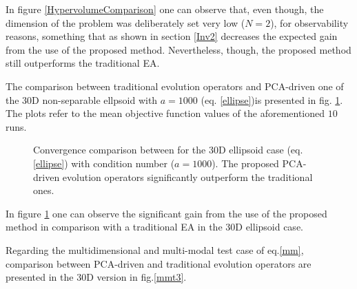 In figure \ref{HypervolumeComparison} one can observe that, even though, the dimension of the problem was deliberately set very low ($N=2$), for observability reasons, something that as shown in section \ref{Inv2} decreases the expected gain from the use of the proposed method. Nevertheless, though, the proposed method still outperforms the traditional EA.  

The comparison between traditional evolution operators and PCA-driven one of the 30D non-separable ellpsoid with $a=1000$ (eq. \ref{ellipse})is presented in fig. \ref{Ellt3}. The plots refer to the mean objective function values of the aforementioned $10$ runs. 

\begin{figure}[h!]
\begin{minipage}[b]{1\linewidth}
 \centering
\end{minipage}
\caption{Convergence comparison between for the 30D ellipsoid case (eq. \ref{ellipse}) with condition number ($a = 1000$). The proposed PCA-driven evolution operators significantly outperform the traditional ones.} 
\label{Ellt3}
\end{figure}

In figure \ref{Ellt3} one can observe the significant gain from the use of the proposed method in comparison with a traditional EA in the 30D ellipsoid case.

Regarding the multidimensional and multi-modal test case of eq.\ref{mm}, comparison between PCA-driven and traditional evolution operators are presented in the 30D version in fig.\ref{mmt3}.  

